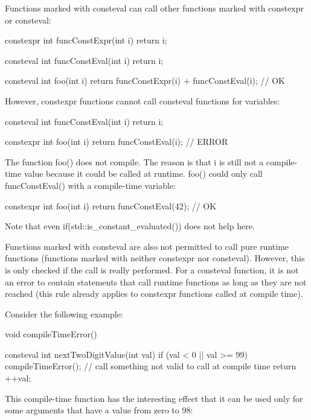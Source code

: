 
Functions marked with consteval can call other functions marked with constexpr or consteval:

\begin{cpp}
constexpr int funcConstExpr(int i) {
	return i;
}

consteval int funcConstEval(int i) {
	return i;
}

consteval int foo(int i) {
	return funcConstExpr(i) + funcConstEval(i); // OK
}
\end{cpp}

However, constexpr functions cannot call consteval functions for variables:

\begin{cpp}
consteval int funcConstEval(int i) {
	return i;
}

constexpr int foo(int i) {
	return funcConstEval(i); // ERROR
}
\end{cpp}

The function foo() does not compile. The reason is that i is still not a compile-time value because it could be called at runtime. foo() could only call funcConstEval() with a compile-time variable:

\begin{cpp}
constexpr int foo(int i) {
	return funcConstEval(42); // OK
}
\end{cpp}

Note that even if(std::is\_constant\_evaluated()) does not help here.

Functions marked with consteval are also not permitted to call pure runtime functions (functions marked with neither constexpr nor consteval). However, this is only checked if the call is really performed. For a consteval function, it is not an error to contain statements that call runtime functions as long as they are not reached (this rule already applies to constexpr functions called at compile time).

Consider the following example:

\begin{cpp}
void compileTimeError()
{
}

consteval int nextTwoDigitValue(int val)
{
	if (val < 0 || val >= 99) {
		compileTimeError(); // call something not valid to call at compile time
	}
	return ++val;
}
\end{cpp}

This compile-time function has the interesting effect that it can be used only for some arguments that have a value from zero to 98:

